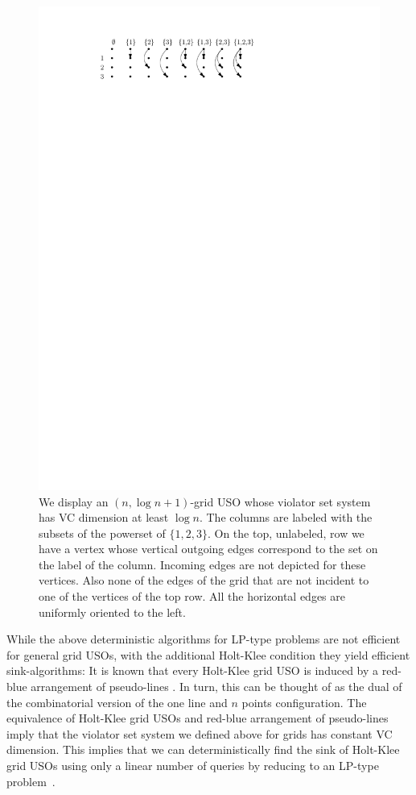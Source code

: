 \documentclass[runningheads,a4paper]{llncs}
\newcommand{\sinkalgs}{sink-algorithms\xspace}
\begin{document}
\begin{figure}[h!] 
  	\centering
  	\includegraphics{shatteredgrid.pdf}
  	\caption{\small We display an $(n,\log n + 1)$-grid USO whose violator set system has VC dimension at least $\log n$. 
	  The columns are labeled with the subsets of the powerset of $\{1,2,3\}$. On the top, unlabeled, row we have a vertex whose 
	  vertical outgoing edges correspond to the set on the label of the column. Incoming edges are not depicted for these vertices. Also none 
	  of the edges of the grid that are not incident to one of the vertices of the top row. All the horizontal edges are uniformly oriented to the left.} 
  	\label{fig:shatteredgrid}
  \end{figure}
  
While the above deterministic algorithms for LP-type problems are not efficient for general grid USOs, with the additional Holt-Klee condition they yield efficient \sinkalgs:
It is known that every Holt-Klee grid USO is induced by a red-blue arrangement of pseudo-lines \cite{grid05,falkthesis}. 
In turn, this can be thought of as the dual of the combinatorial version of the one line and $n$ points configuration.
The equivalence of Holt-Klee grid USOs and red-blue arrangement of pseudo-lines imply that the violator set system we defined above for grids has constant VC dimension. 
This implies that we can deterministically find the sink of Holt-Klee grid USOs using only a linear number of queries by reducing to an LP-type problem~\cite{chan16,ChazelleM96}.
\end{document}

